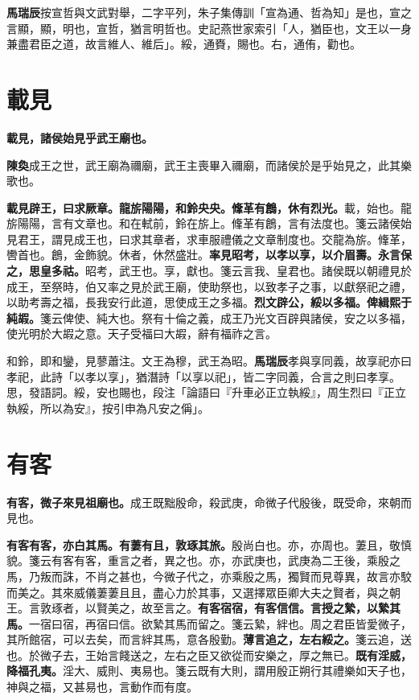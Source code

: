 \begin{quoting}\textbf{馬瑞辰}按宣哲與文武對舉，二字平列，朱子集傳訓「宣為通、哲為知」是也，宣之言顯，顯，明也，宣哲，猶言明哲也。史記燕世家索引「人，猶臣也，文王以一身兼盡君臣之道，故言維人、維后」。綏，通賚，賜也。右，通侑，勸也。\end{quoting}

\section{載見}


\textbf{載見，諸侯始見乎武王廟也。}

\begin{quoting}\textbf{陳奐}成王之世，武王廟為禰廟，武王主喪畢入禰廟，而諸侯於是乎始見之，此其樂歌也。\end{quoting}

\textbf{載見辟王，曰求厥章。龍旂陽陽，和鈴央央。鞗革有鶬，休有烈光。}{\footnotesize 載，始也。龍旂陽陽，言有文章也。和在軾前，鈴在旂上。鞗革有鶬，言有法度也。箋云諸侯始見君王，謂見成王也，曰求其章者，求車服禮儀之文章制度也。交龍為旂。鞗革，轡首也。鶬，金飾貌。休者，休然盛壯。}\textbf{率見昭考，以孝以享，以介眉壽。永言保之，思皇多祜。}{\footnotesize 昭考，武王也。享，獻也。箋云言我、皇君也。諸侯既以朝禮見於成王，至祭時，伯又率之見於武王廟，使助祭也，以致孝子之事，以獻祭祀之禮，以助考壽之福，長我安行此道，思使成王之多福。}\textbf{烈文辟公，綏以多福。俾緝熙于純嘏。}{\footnotesize 箋云俾使、純大也。祭有十倫之義，成王乃光文百辟與諸侯，安之以多福，使光明於大嘏之意。天子受福曰大嘏，辭有福祚之言。}

\begin{quoting}和鈴，即和鑾，見蓼蕭注。文王為穆，武王為昭。\textbf{馬瑞辰}孝與享同義，故享祀亦曰孝祀，此詩「以孝以享」，猶潛詩「以享以祀」，皆二字同義，合言之則曰孝享。思，發語詞。綏，安也賜也，段注「論語曰『升車必正立執綏』，周生烈曰『正立執綏，所以為安』，按引申為凡安之偁」。\end{quoting}

\section{有客}


\textbf{有客，微子來見祖廟也。}{\footnotesize 成王既黜殷命，殺武庚，命微子代殷後，既受命，來朝而見也。}

\textbf{有客有客，亦白其馬。有萋有且，敦琢其旅。}{\footnotesize 殷尚白也。亦，亦周也。萋且，敬慎貌。箋云有客有客，重言之者，異之也。亦，亦武庚也，武庚為二王後，乘殷之馬，乃叛而誅，不肖之甚也，今微子代之，亦乘殷之馬，獨賢而見尊異，故言亦駮而美之。其來威儀萋萋且且，盡心力於其事，又選擇眾臣卿大夫之賢者，與之朝王。言敦琢者，以賢美之，故至言之。}\textbf{有客宿宿，有客信信。言授之縶，以縶其馬。}{\footnotesize 一宿曰宿，再宿曰信。欲縶其馬而留之。箋云縶，絆也。周之君臣皆愛微子，其所館宿，可以去矣，而言絆其馬，意各殷勤。}\textbf{薄言追之，左右綏之。}{\footnotesize 箋云追，送也。於微子去，王始言餞送之，左右之臣又欲從而安樂之，厚之無已。}\textbf{既有淫威，降福孔夷。}{\footnotesize 淫大、威則、夷易也。箋云既有大則，謂用殷正朔行其禮樂如天子也，神與之福，又甚易也，言動作而有度。}

